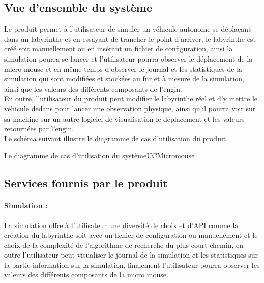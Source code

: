 \subsection{Vue d’ensemble du système} \label{sec:vueEns}

\vspace{5mm}
Le produit permet à l'utilisateur de simuler un véhicule autonome se déplaçant 
dans un labyrinthe et en essayant de trancher le point d'arriver, le labyrinthe 
est créé soit manuellement ou en insérant un fichier de configuration, ainsi la 
simulation pourra se lancer et l'utilisateur pourra observer le déplacement de 
la micro mouse et en même temps d'observer le journal et les statistiques de la 
simulation qui sont modifiées et stockées au fur et à mesure de la simulation, 
ainsi que les valeurs des différents composants de l'engin. \\

En outre, l'utilisateur du produit peut modifier le labyrinthe réel et d'y mettre 
le véhicule dedans pour lancer une observation physique, ainsi qu'il pourra voir 
sur sa machine sur un autre logiciel de visualisation le déplacement et les valeurs 
retournées par l'engin. \\

Le schéma suivant illustre le diagramme de cas d'utilisation du produit.


{Le diagramme de cas d'utilisation du système}{UCMicromouse}

\subsection{Services fournis par le produit} \label{sec:serLogiciel}

\paragraph{Simulation :}La simulation offre à l'utilisateur une diversité de choix 
et d'API comme la création du labyrinthe soit avec un fichier de configuration ou 
manuellement et le choix de la complexité de l'algorithme de recherche du plus court chemin, 
en outre l'utilisateur peut visualiser le journal de la simulation et les statistiques 
sur la partie information sur la simulation, finalement l'utilisateur pourra observer 
les valeurs des différents composants de la micro mouse.



